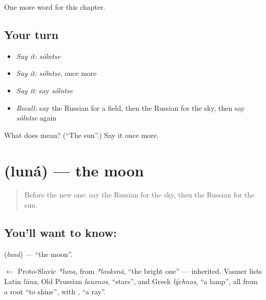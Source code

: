 \begin{grammarlens}[title={What you've built}]
One more word for this chapter.
\end{grammarlens}

\subsection*{Your turn}
\begin{itemize}
\raggedright
  \item \emph{Say it:} \emph{sólntse}
  \item \emph{Say it:} \emph{sólntse}, once more
  \item \emph{Say it:} say \emph{sólntse}
  \item \emph{Recall:} say the Russian for a field, then the Russian for the sky, then say \emph{sólntse} again
\end{itemize}

\begin{tcolorbox}[breakable,colback=teal!4,colframe=teal!35!black,title={Before you move on}]
What does  mean? (\textquotedblleft{}The sun\textquotedblright{}.) Say it once more.
\end{tcolorbox}
\section[\texorpdfstring{\ru{луна} (luná)}{луна (luná)}]{ (luná) — the moon}

\label{lesson:RU-C58-moon}



\begin{quote}
Before the new one: say the Russian for the sky, then the Russian for the sun.
\end{quote}

\subsection*{You'll want to know: }
\textbf{} (\emph{luná}) — \textquotedblleft{}the moon\textquotedblright{}.

\begin{cousinweb}
\textbf{} $\leftarrow$ Proto-Slavic \emph{*luna}, from \emph{*louksnā}, \textquotedblleft{}the bright one\textquotedblright{} — inherited. Vasmer lists Latin \emph{lūna}, Old Prussian \emph{lauxnos}, \textquotedblleft{}stars\textquotedblright{}, and Greek \emph{lýchnos}, \textquotedblleft{}a lamp\textquotedblright{}, all from a root \textquotedblleft{}to shine\textquotedblright{}, with \emph{}, \textquotedblleft{}a ray\textquotedblright{}.
\end{cousinweb}

